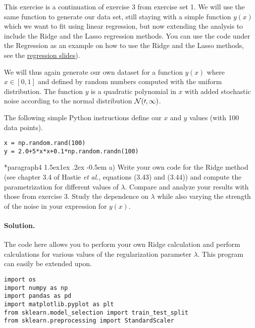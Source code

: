 \documentclass[%
oneside,                 %
final,                   %
10pt]{article}
\makeatletter
\newenvironment{doconceexercise}{}{}
\newcounter{doconceexercisecounter}
\newcommand\subex{\@startsection*{paragraph}{4}{\z@}%
                  {1.5ex\@plus1ex \@minus.2ex}%
                  {-0.5em}%
                  {\normalfont\normalsize\bfseries}}
\makeatother
\begin{document}
\begin{doconceexercise}



This exercise is a continuation of exercise 3 from exercise set 1. We will
use the same function to generate our data set, still staying with a
simple function $y(x)$ which we want to fit using linear regression,
but now extending the analysis to include the Ridge and the Lasso
regression methods. You can use the code under the Regression as an example on how to use the Ridge and the Lasso methods, see the \href{{https://compphysics.github.io/MachineLearning/doc/pub/Regression/html/Regression-bs.html}}{regression slides}). 

We will thus again generate our own dataset for a function $y(x)$ where 
$x \in [0,1]$ and defined by random numbers computed with the uniform
distribution. The function $y$ is a quadratic polynomial in $x$ with
added stochastic noise according to the normal distribution $\cal{N}(0,1)$.

The following simple Python instructions define our $x$ and $y$ values (with 100 data points).
\begin{verbatim}
x = np.random.rand(100)
y = 2.0+5*x*x+0.1*np.random.randn(100)
\end{verbatim}


\subex{a)}
Write your own code for the Ridge method (see chapter 3.4 of Hastie \emph{et al.}, equations (3.43) and (3.44)) and compute the parametrization for different values of $\lambda$. Compare and analyze your results with those from exercise 3. Study the dependence on $\lambda$ while also varying the strength of the noise in your expression for $y(x)$.


\paragraph{Solution.}
The code here allows you to perform your own Ridge calculation and perform calculations for various values of the regularization parameter $\lambda$. This program can easily be extended upon.
\begin{verbatim}
import os
import numpy as np
import pandas as pd
import matplotlib.pyplot as plt
from sklearn.model_selection import train_test_split
from sklearn.preprocessing import StandardScaler


\end{verbatim}
\end{doconceexercise}
\end{document}
